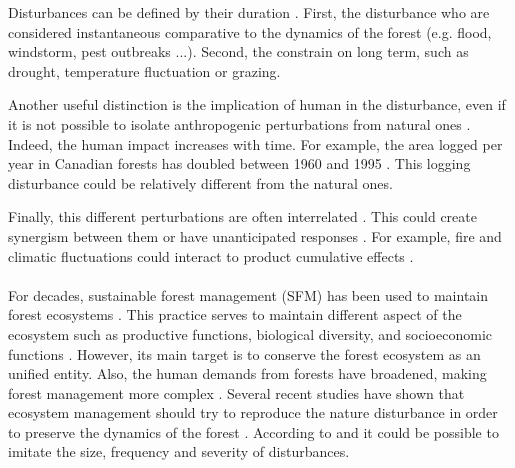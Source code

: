 \documentclass{article}
\begin{document}
Disturbances can be defined by their duration \cite{perera_simulation_2015}. First, the disturbance who are considered instantaneous comparative to the dynamics of the forest (e.g. flood, windstorm, pest outbreaks ...).
Second, the constrain on long term, such as drought, temperature fluctuation or grazing.

Another useful distinction is the implication of human in the disturbance, even if it is not possible to isolate anthropogenic perturbations from natural ones \cite{perera_simulation_2015}.
Indeed, the human impact increases with time. For example, the area logged per year in Canadian forests has doubled between 1960 and 1995 \cite{smith_canadas_2000}. This logging disturbance could be relatively different from the natural ones.


Finally, this different perturbations are often interrelated \cite{keane2015exploring}. This could create synergism between them \cite{mandre_environmental_2011} or have unanticipated responses \cite{perera_simulation_2015}. For example, fire and climatic fluctuations could interact to product cumulative effects \cite{romme_historical_2009}.



\paragraph{}
For decades, sustainable forest management (SFM) has been used to maintain forest ecosystems \cite{macdicken_global_2015}. 
This practice serves to maintain different aspect of the ecosystem such as productive functions, biological diversity, and socioeconomic functions \cite{makela_using_2012}. 
However, its main target is to conserve the forest ecosystem as an unified entity. %
Also, the human demands from forests have broadened, making forest management more complex \cite{eggers_balancing_2017}. Several recent studies have shown that ecosystem management should try to reproduce the nature disturbance in order to preserve the dynamics of the forest \cite{bengston_changing_1994} \cite{bengtsson_biodiversity_2000}. 
According to \cite{hunter1990wildlife} and \cite{hunter1988paleoecology} it could be possible to imitate the size, frequency and severity of disturbances.
\end{document}
